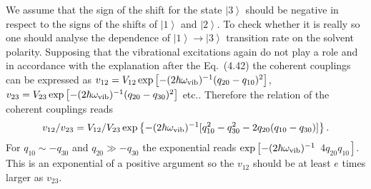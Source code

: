 \documentclass[12pt,twoside,a4paper]{report}
\begin{document}
We assume that the sign of the shift for the state $\left| 3 \right>$
should be negative in respect to the signs of the shifts of $\left| 1 \right>$
and  $\left| 2 \right>$.
To check whether it is really so one should analyse the dependence
of $\left| 1 \right> \to \left| 3 \right>$
transition rate on the solvent polarity.
Supposing that the vibrational excitations again do not
play a role and
in accordance with the explanation after the Eq.~(4.42)
the coherent couplings can be expressed as 
$v_{12}
         =
             V_{12}
             \exp{
                   \left[
                         -{(2 \hbar \omega_{\rm vib})^{-1}}
                          {(q_{20}-q_{10})^2}
                   \right]}$,
$v_{23}
         =
             V_{23}
             \exp{
                   \left[
                          -{(2 \hbar \omega_{\rm vib})^{-1}}
                           {(q_{20}-q_{30})^2}
                   \right]}$ etc..
Therefore the relation of the coherent couplings reads
$$
   {v_{12}} /
   {v_{23}}
             =   
                    {V_{12}} /
                     {V_{23}}
                         \exp
                              \left\{
                                     -{(2 \hbar \omega_{\rm vib})^{-1}}
                                [
                                     q_{10}^2
                                 -   q_{30}^2
                                 - 2 q_{20}
                                     (
                                         q_{10}
                                       - q_{30}
                                     )
                                ]  
                              \right\}.$$
For $q_{10} \sim -q_{30}$
and $q_{20} \gg  -q_{30}$
the exponential reads 
$ \exp 
       \left[
                        -{(2 \hbar \omega_{\rm vib})^{-1}}                         
       \right.
$
$
       \left.
                                 {
                                   4  q_{20}
                                      q_{10}
                                  }
        \right]$.
This is an exponential of a positive argument so the $v_{12}$
should be at least $e$ times larger as $v_{23}$.
\end{document}
